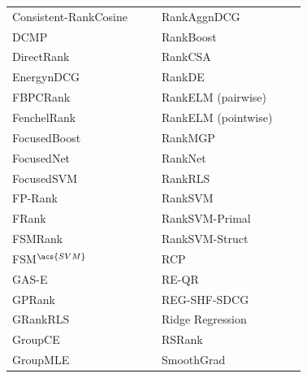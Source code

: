 \begin{table}[!h]
{\begin{tabular}{|l|l|l||l|l|l|}
Consistent-RankCosine & \cite{Ravikumar2011} & \cite{Tan2013} & RankAgg\acs{nDCG} & \cite{Wang2013} & \cite{Wang2013} \\ 
DCMP & \cite{Renjifo2012}  & \cite{Renjifo2012}  & RankBoost & \cite{Freund2003} & \cite{Busa-Fekete2013, Alcantara2010} \\ 
DirectRank & \cite{Tan2013} & \cite{Tan2013} & RankCSA & \cite{He2010} & \cite{He2010} \\ 
Energy\acs{nDCG} & \cite{Freno2011} & \cite{Freno2011} & RankDE & \cite{Bollegala2011} & \cite{Sato2013} \\ 
FBPCRank & \cite{Lai2011} & \cite{Lai2011} & RankELM (pairwise) & \cite{Zong2013} & \cite{Zong2013} \\ 
FenchelRank & \cite{Lai2013} & \cite{Lai2013, Lai2013b, Laporte2013} & RankELM (pointwise) & \cite{Zong2013} & \cite{Zong2013} \\ 
FocusedBoost & \cite{Niu2012} & \cite{Niu2012} & RankMGP & \cite{Lin2012} & \cite{Lin2012} \\ 
FocusedNet & \cite{Niu2012} & \cite{Niu2012} & RankNet & \cite{Burges2005} & \cite{Busa-Fekete2013, Papini2012, Niu2012} \\ 
Focused\acs{SVM} & \cite{Niu2012} & \cite{Niu2012} & Rank\acs{RLS} & \cite{Pahikkala2009} & \cite{Pahikkala2010} \\ 
FP-Rank & \cite{Song2013} & \cite{Song2013} & Rank\acs{SVM} & \cite{Herbrich1999, Joachims2002} & \cite{Busa-Fekete2013, Freno2011, He2010, Alcantara2010} \\ 
FRank & \cite{Tsai2007} & \cite{Wang2012} & Rank\acs{SVM}-Primal &  & \cite{Lai2011} \\ 
FSMRank & \cite{Lai2013c} & \cite{Lai2013c,Laporte2013} & Rank\acs{SVM}-Struct &  &  \\
FSM$^{\acs{SVM}}$ & \cite{Lai2013c} & \cite{Lai2013c} & RCP & \cite{Elsas2008} & \cite{Elsas2008} \\ 
GAS-E & \cite{Geng2007} & \cite{Lai2013c} & RE-QR & \cite{Veloso2010} & \cite{Veloso2010} \\ 
\acs{GP}Rank & \cite{Silva2009} & \cite{Torkestani2012, Alcantara2010} & REG-SHF-SDCG & \cite{Wu2009} & \cite{Wu2009} \\ 
GRank\acs{RLS} & \cite{Pahikkala2010} & \cite{Pahikkala2010} & Ridge Regression & \cite{Cossock2006} &  \\ 
Group\acs{CE} & \cite{Lin2011} & \cite{Lin2011} & RSRank & \cite{Sun2009} & \cite{Lai2013} \\ 
Group\acs{MLE} & \cite{Lin2010} & \cite{Lin2011} & SmoothGrad & \cite{Le2007} & \cite{Tan2013} \\ 

\end{tabular}}
\end{table}
